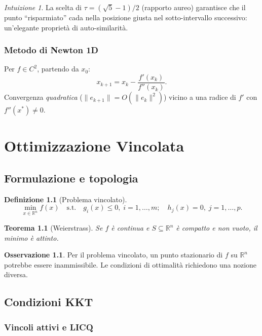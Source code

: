 \documentclass[11pt, a4paper, twoside]{book}
\theoremstyle{definition}
\newtheorem{defn}{Definizione}[chapter]
\newtheorem{remark}{Osservazione}[chapter]
\theoremstyle{plain}
\newtheorem{thm}{Teorema}[chapter]
\theoremstyle{remark}
\newtheorem{intuition}{Intuizione}[chapter]
\newcommand{\R}{\mathbb{R}}
\begin{document}
\begin{intuition}
La scelta di $\tau = (\sqrt{5}-1)/2$ (rapporto aureo) garantisce che il punto ``risparmiato'' cada nella posizione giusta nel sotto-intervallo successivo: un'elegante proprietà di auto-similarità.
\end{intuition}

\subsection{Metodo di Newton 1D}

Per $f \in C^2$, partendo da $x_0$:
\[
  x_{k+1} = x_k - \frac{f'(x_k)}{f''(x_k)}.
\]
Convergenza \emph{quadratica} ($\|e_{k+1}\| = O(\|e_k\|^2)$) vicino a una radice di $f'$ con $f''(x^*) \neq 0$.

\chapter{Ottimizzazione Vincolata}
\label{ch:vincolata}

\section{Formulazione e topologia}

\begin{defn}[Problema vincolato]
\[
  \min_{x \in \R^n} f(x) \quad \text{s.t.} \quad g_i(x) \leq 0, \; i = 1,\ldots,m; \quad h_j(x) = 0, \; j = 1,\ldots,p.
\]
\end{defn}

\begin{thm}[Weierstrass]
Se $f$ è continua e $S \subseteq \R^n$ è compatto e non vuoto, il minimo è attinto.
\end{thm}

\begin{remark}
Per il problema vincolato, un punto stazionario di $f$ su $\R^n$ potrebbe essere inammissibile. Le condizioni di ottimalità richiedono una nozione diversa.
\end{remark}

\section{Condizioni KKT}
\label{sec:kkt}

\subsection{Vincoli attivi e LICQ}
\end{document}
